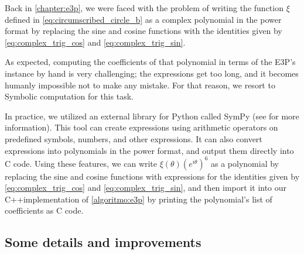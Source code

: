 Back in \autoref{chapter:e3p}, we were faced with the problem of writing the function $\xi$ defined in \autoref{eq:circumscribed_circle_b} as a complex polynomial in the power format by replacing the sine and cosine functions with the identities given by  \autoref{eq:complex_trig_cos} and \autoref{eq:complex_trig_sin}.

As expected, computing the coefficients of that polynomial in terms of the E3P's instance by hand is very challenging; the expressions get too long, and it becomes humanly impossible not to make any mistake. 
For that reason, we resort to Symbolic computation for this task.

In practice, we utilized an external library for Python called SymPy (see  for more information).
This tool can create expressions using arithmetic operators on predefined symbols, numbers, and other expressions. It can also convert expressions into polynomials in the power format, and output them directly into C code. Using these features, we can write $\xi(\theta)(e^{i\theta})^6$ as a polynomial by replacing the sine and cosine functions with expressions for the identities given by  \autoref{eq:complex_trig_cos} and \autoref{eq:complex_trig_sin}, and then import it into our C++implementation of \autoref{algoritmo:e3p} by printing the polynomial's list of coefficients as C code.


\subsection{Some details and improvements}